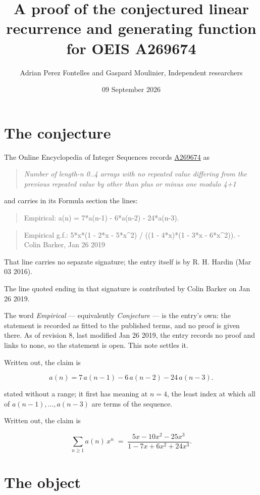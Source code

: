 \documentclass[11pt]{article}
\title{A proof of the conjectured linear recurrence and generating function for OEIS A269674}
\author{Adrian Perez Fontelles and Gaspard Moulinier, Independent researchers}
\date{09 September 2026}
\theoremstyle{definition}
\begin{document}
\maketitle
\section{The conjecture}

The Online Encyclopedia of Integer Sequences records \href{https://oeis.org/A269674}{A269674} as

\begin{quote}\itshape Number of length-n 0..4 arrays with no repeated value differing from the previous repeated value by other than plus or minus one modulo 4+1\end{quote}

and carries in its Formula section the lines:

\begin{quote}\ttfamily Empirical: a(n) = 7*a(n-1) - 6*a(n-2) - 24*a(n-3).\end{quote}

\begin{quote}\ttfamily Empirical g.f.: 5*x*(1 - 2*x - 5*x\textasciicircum{}2) / ((1 - 4*x)*(1 - 3*x - 6*x\textasciicircum{}2)). - Colin Barker, Jan 26 2019\end{quote}

That line carries no separate signature; the entry itself is by R. H. Hardin (Mar 03 2016).

The line quoted ending in that signature is contributed by Colin Barker on Jan 26 2019.

The word {\itshape Empirical} --- equivalently {\itshape Conjecture} --- is the entry's own: the statement is recorded as fitted to the published terms, and no proof is given there. As of revision 8, last modified Jan 26 2019, the entry records no proof and links to none, so the statement is open. This note settles it.

Written out, the claim is

\[a(n) = 7\,a(n-1) - 6\,a(n-2) - 24\,a(n-3).\]

stated without a range; it first has meaning at $n = 4$, the least index at which all of $a(n-1),\dots,a(n-3)$ are terms of the sequence.

Written out, the claim is

\[\sum_{n \ge 1} a(n)\,x^n \;=\; \frac{5x - 10x^{2} - 25x^{3}}{1 - 7x + 6x^{2} + 24x^{3}}.\]

\section{The object}
\end{document}
